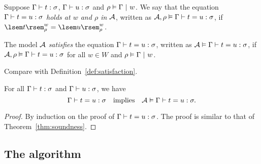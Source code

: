 \begin{defn}[Satisfaction]
\hfill \vspace{-6pt}
\begin{enum}
\item Suppose $\Gamma \vdash t : \sigma$, $\Gamma \vdash u : \sigma$ and $\rho \vDash \Gamma \ |\  w$. We say that the equation $\Gamma \vdash t = u : \sigma$ \emph{holds at $w$ and $\rho$ in $\mathcal{A}$}, written as $\mathcal{A}, \rho \vDash \Gamma \vdash t = u : \sigma$, if $\ksint{t}{\rho}{w} = \ksint{u}{\rho}{w}$.

\item The model $\mathcal{A}$ \emph{satisfies} the equation $\Gamma \vdash t = u : \sigma$, written as $\mathcal{A} \vDash \Gamma \vdash t = u : \sigma$, if $\mathcal{A}, \rho \vDash \Gamma \vdash t = u : \sigma$ for all $w \in W$ and $\rho \vDash \Gamma \ |\  w$.
\end{enum}
\end{defn}
\begin{rem}
Compare with Definition~\ref{def:satisfaction}.
\end{rem}

\begin{thm}[Soundness] \label{thm:kripke-soundness}
For all $\Gamma \vdash t : \sigma$ and $\Gamma \vdash u : \sigma$, we have
\[ \Gamma \vdash t = u : \sigma \quad\text{implies}\quad
    \mathcal{A} \vDash \Gamma \vdash t = u : \sigma. \]
\begin{proof}
By induction on the proof of $\Gamma \vdash t = u : \sigma$. The proof is similar to that of Theorem~\ref{thm:soundness}.
\end{proof}
\end{thm}

\subsection{The algorithm} \label{sec:nbe-alg}

